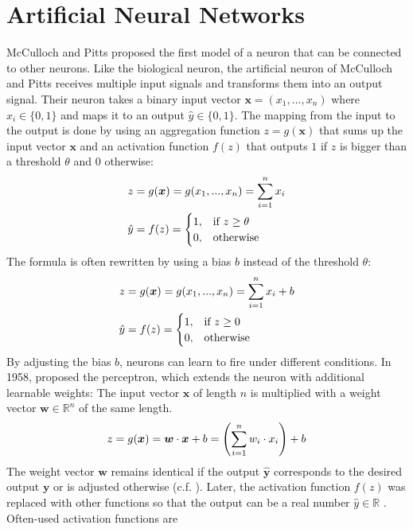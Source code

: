 \section{Artificial Neural Networks}
McCulloch and Pitts  proposed the first model of a neuron that can be connected to other neurons.
Like the biological neuron, the artificial neuron of McCulloch and Pitts receives multiple input signals and transforms them into an output signal.
Their neuron takes a binary input vector $\boldsymbol{x} = (x_1, ..., x_n)$ where $x_i \in \{0, 1\}$ and maps it to an output $\hat{y} \in \{0, 1\}$.
The mapping from the input to the output is done by using an aggregation function $z = g(\boldsymbol{x})$ that sums up the input vector $\boldsymbol{x}$ and an activation function $f(z)$ that outputs $1$ if $z$ is bigger than a threshold $\theta$ and $0$ otherwise:
%
\begin{align}\eqlbl{McCulloch_Pitts_agg}%
	z &= g(\boldsymbol{x}) = g(x_1, ..., x_n) = \sum_{i=1}^{n}x_i\\
		\hat{y} &= f(z) = \begin{cases}
      		1, & \text{if}\ z \geq \theta \\
      		0, & \text{otherwise}
    	\end{cases}
\end{align}
%
The formula is often rewritten by using a bias $b$ instead of the  threshold $\theta$:
%
\begin{align}\eqlbl{McCulloch_Pitts_agg2}%
	z &= g(\boldsymbol{x}) = g(x_1, ..., x_n) = \sum_{i=1}^{n}x_i + b\\
		\hat{y} &= f(z) = \begin{cases}
      		1, & \text{if}\ z \geq 0 \\
      		0, & \text{otherwise}
    	\end{cases}
\end{align}
%
By adjusting the bias $b$, neurons can learn to fire under different conditions.
In 1958,  proposed the perceptron, which extends the neuron with additional learnable weights: The input vector $\boldsymbol{x}$ of length $n$ is multiplied with a weight vector $\boldsymbol{w} \in \mathbb{R}^n$ of the same length.
%
\begin{align}\eqlbl{nn}%
	z = g(\boldsymbol{x}) = \boldsymbol{w} \cdot \boldsymbol{x} + b = \left( \sum_{i=1}^{n}w_i \cdot x_i \right) + b
\end{align}
%
The weight vector $\boldsymbol{w}$ remains identical if the output $\boldsymbol{\hat{y}}$ corresponds to the desired output $\boldsymbol{y}$ or is adjusted otherwise (c.f. ). Later, the activation function \(f(z)\) was replaced with other functions so that the output can be a real number \(\hat{y} \in \mathbb{R}\) . Often-used activation functions are
